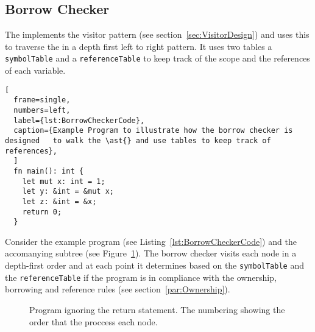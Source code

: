 \subsection{Borrow Checker}
\label{sec:BorrowCheckerDesign}

The \borrowChecker{} implements the visitor pattern (see
section~\ref{sec:VisitorDesign}) and uses this to traverse the \ast{} in a depth first
left to right pattern. It uses two tables a \texttt{symbolTable} and a
\texttt{referenceTable} to keep track of the scope and the
references of each variable.

\begin{lstlisting}[
  frame=single,
  numbers=left,
  label={lst:BorrowCheckerCode},
  caption={Example Program to illustrate how the borrow checker is designed   to walk the \ast{} and use tables to keep track of references},
  ]
  fn main(): int {
    let mut x: int = 1;
    let y: &int = &mut x;
    let z: &int = &x;
    return 0;
  }
\end{lstlisting}

Consider the example program (see Listing~\ref{lst:BorrowCheckerCode}) and the
accomanying subtree (see Figure~\ref{fig:astBorrowCheckerDesignCode}). The borrow checker visits each node
in a depth-first order and at each point it determines based on the \texttt{symbolTable}
and the \texttt{referenceTable} if the
program is in compliance with the ownership, borrowing and reference rules (see
section~\ref{par:Ownership}).

\begin{figure}[ht]
  \centering
  \caption{Program \ast{} ignoring the return statement. The numbering showing the
  order that the \borrowChecker{} proccess each node.}
  \label{fig:astBorrowCheckerDesignCode}
\end{figure}

